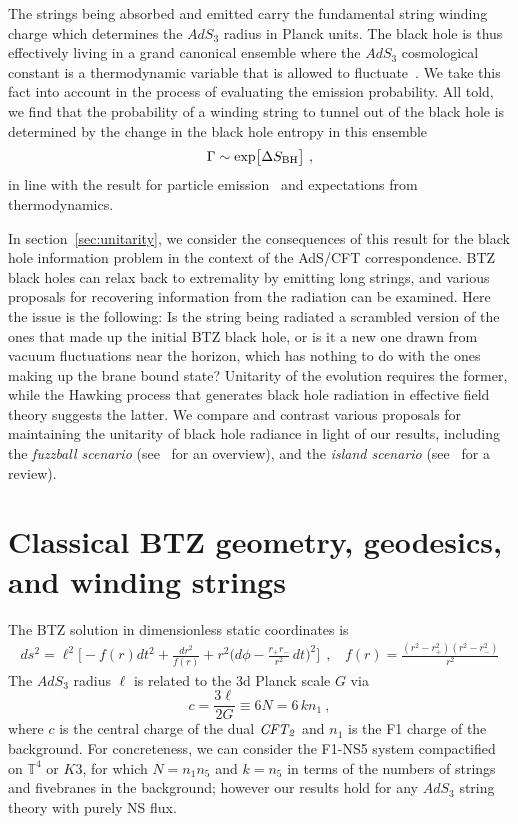 \documentclass[11pt]{article}
\newcommand{\rcite}{\cite}
\def\BH{{\rm BH}}
\def\be{\begin{equation}}
\def\ee{\end{equation}}
\newcommand{\bT}{{\mathbb T}}
\numberwithin{equation}{section}
\def\exp{{\rm exp}}
\begin{document}
The strings being absorbed and emitted carry the fundamental string winding charge which determines the $AdS_3$ radius in Planck units.  The black hole is thus effectively living in a grand canonical ensemble where the $AdS_3$ cosmological constant is a thermodynamic variable that is allowed to fluctuate~\rcite{Caldarelli:1999xj,Kastor:2009wy,Cvetic:2010jb,Wang:2006eb,Dolan:2010zz,Dolan:2010ha}.  We take this fact into account in the process of evaluating the emission probability.  All told, we find that the probability of a winding string to tunnel out of the black hole is determined by the change in the black hole entropy in this ensemble
\be
\Gamma \sim \exp\big[ \Delta S_\BH \big]  ~,
\ee
in line with the result for particle emission~\rcite{Keski-Vakkuri:1996wom,Massar:1999wg,Parikh:1999mf} and expectations from thermodynamics.

In section~\ref{sec:unitarity}, we consider the consequences of this result for the black hole information problem in the context of the AdS/CFT correspondence.  BTZ black holes can relax back to extremality by emitting long strings, and various proposals for recovering information from the radiation can be examined.
Here the issue is the following: Is the string being radiated a scrambled version of the ones that made up the initial BTZ black hole, or is it a new one drawn from vacuum fluctuations near the horizon, which has nothing to do with the ones making up the brane bound state?  Unitarity of the evolution requires the former, while the Hawking process that generates black hole radiation in effective field theory suggests the latter.  We compare and contrast various proposals for maintaining the unitarity of black hole radiance in light of our results, including the {\it fuzzball scenario} (see~\rcite{Bena:2022rna} for an overview), and the {\it island scenario} (see~\rcite{Almheiri:2020cfm} for a review).






\section{Classical BTZ geometry, geodesics, and winding strings}
\label{sec:classical}

The BTZ solution in dimensionless static coordinates is
\begin{align}
\label{BTZmetric}
ds^2 = \ell^2\Big[ - f(r) dt^2 +\frac{dr^2}{f(r)} + r^2\Big( d\phi - \frac{r_+r_-}{ r^2}\, dt\Big)^2 \Big]
~~,~~~~
f(r) = \frac{(r^2-r_+^2)(r^2-r_-^2)}{ r^2}
\end{align}
The $AdS_3$ radius $\ell$ is related to the 3d Planck scale $G$ via
\be
\label{centchg}
c = \frac{3\ell}{2G} \equiv 6N = 6 \, k n_1  ~,
\ee
where $c$ is the central charge of the dual $\it CFT_2$ and $n_1$ is the F1 charge of the background.
For concreteness, we can consider the F1-NS5 system compactified on $\bT^4$ or $K3$, for which $N=n_1n_5$ and $k=n_5$ in terms of the numbers of strings and fivebranes in the background; however our results hold for any $AdS_3$ string theory with purely NS flux.
\end{document}

